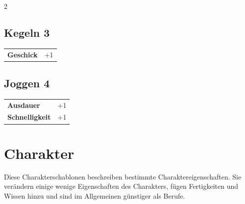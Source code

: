 \begin{multicols}{2}
\begin{tcolorbox}
\end{tcolorbox}

\begin{tcolorbox}
    \subsection*{Kegeln \hfill \small{3 }}
    \tcblower




\begin{tabular}{@{}ll@{}}
    \textbf{Geschick} & +1\\
\end{tabular}


\end{tcolorbox}

\begin{tcolorbox}
    \subsection*{Joggen \hfill \small{4 }}
    \tcblower




\begin{tabular}{@{}ll@{}}
    \textbf{Ausdauer} & +1\\
    \textbf{Schnelligkeit} & +1\\
\end{tabular}


\end{tcolorbox}

\section{Charakter}

Diese Charakterschablonen beschreiben bestimmte Charaktereigenschaften. Sie verändern einige wenige Eigenschaften des Charakters, fügen Fertigkeiten und Wissen hinzu und sind im Allgemeinen günstiger als Berufe.


\end{multicols}
